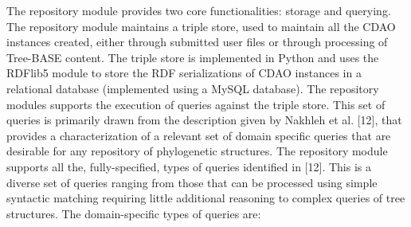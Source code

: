 \documentclass[10pt]{article}
\begin{document}
The repository module provides two core functionalities: storage and querying. The repository module maintains a triple store, used to maintain all
the CDAO instances created, either through submitted user files or through processing of Tree-BASE content. The triple store is implemented in
Python and uses the RDFlib5 module to store the RDF serializations of CDAO instances in a relational database (implemented using a MySQL database).
The repository modules supports the execution of queries against the triple store. This set of queries is primarily drawn from the description given by Nakhleh et al. [12], 
that provides a characterization of a relevant set of domain specific queries that are desirable for any repository of phylogenetic structures. The repository module supports
 all the, fully-specified, types of queries identified in [12]. This is a diverse set of queries ranging from those that can be processed using simple syntactic matching requiring little additional reasoning to complex queries of tree structures. The domain-specific types of queries are:
\end{document}
